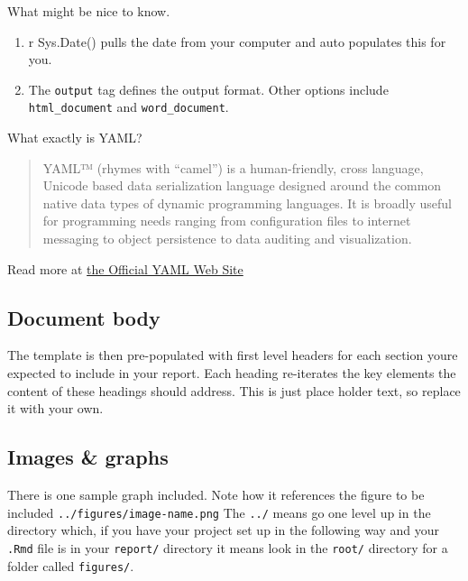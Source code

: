\documentclass[
]{book}
\providecommand{\tightlist}{%
  \setlength{\itemsep}{0pt}\setlength{\parskip}{0pt}}
\begin{document}
What might be nice to know.

\begin{enumerate}
\def\labelenumi{\arabic{enumi}.}
\tightlist
\item
  r Sys.Date() pulls the date from your computer and auto populates this for you.
\item
  The \texttt{output} tag defines the output format. Other options include \texttt{html\_document} and \texttt{word\_document}.
\end{enumerate}

What exactly is YAML?

\begin{quote}
YAML™ (rhymes with ``camel'') is a human-friendly, cross language, Unicode based data serialization language designed around the common native data types of dynamic programming languages. It is broadly useful for programming needs ranging from configuration files to internet messaging to object persistence to data auditing and visualization.
\end{quote}

Read more at \href{https://yaml.org/}{the Official YAML Web Site}

\hypertarget{document-body}{%
\subsection*{Document body}\label{document-body}}

The template is then pre-populated with first level headers for each section you\textquotesingle re expected to include in your report. Each heading re-iterates the key elements the content of these headings should address. This is just place holder text, so replace it with your own.

\hypertarget{images-graphs}{%
\subsection*{Images \& graphs}\label{images-graphs}}

There is one sample graph included. Note how it references the figure to be included \texttt{../figures/image-name.png} The \texttt{../} means \textquotesingle go one level up in the directory\textquotesingle{} which, if you have your project set up in the following way and your \texttt{.Rmd} file is in your \texttt{report/} directory it means \textquotesingle look in the \texttt{root/} directory for a folder called \texttt{figures/}.
\end{document}
